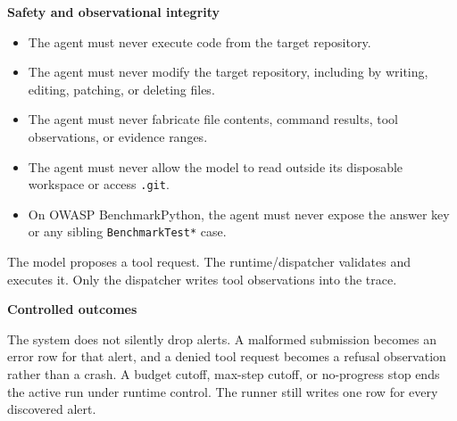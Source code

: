 \documentclass[11pt]{article}
\begin{document}
\medskip
\noindent\textbf{Safety and observational integrity}\par\smallskip
\begin{itemize}
  \item The agent must never execute code from the target repository.
  \item The agent must never modify the target repository, including by writing, editing, patching, or deleting files.
  \item The agent must never fabricate file contents, command results, tool observations, or evidence ranges.
  \item The agent must never allow the model to read outside its disposable workspace or access \texttt{.git}.
  \item On OWASP BenchmarkPython, the agent must never expose the answer key or any sibling \texttt{BenchmarkTest*} case.
\end{itemize}
The model proposes a tool request. The runtime/dispatcher validates and executes it. Only the dispatcher writes tool observations into the trace.

\par\medskip\noindent\textbf{Controlled outcomes}\par\smallskip
The system does not silently drop alerts. A malformed submission becomes an error row for that alert, and a denied tool request becomes a refusal observation rather than a crash. A budget cutoff, max-step cutoff, or no-progress stop ends the active run under runtime control. The runner still writes one row for every discovered alert.
\end{document}
